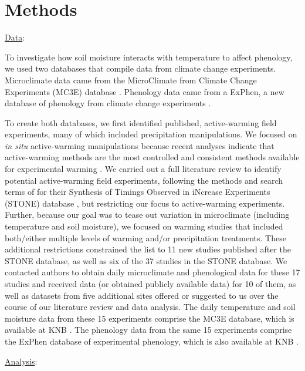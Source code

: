 \documentclass{article}
\begin{document}
\clearpage


\section* {Methods}
\underline{Data}: 
\par To investigate how soil moisture interacts with temperature to affect phenology, we used two databases that compile data from climate change experiments. Microclimate data came from the  MicroClimate from Climate Change Experiments (MC3E) database \cite{ettinger2018}. Phenology data came from a ExPhen, a new database of phenology from climate change experiments \cite{ettinger2018b}. 
\par To create both databases, we first identified published, active-warming field experiments, many of which included precipitation manipulations. We focused on \textit{in situ} active-warming manipulations because recent analyses indicate that active-warming methods are the most controlled and consistent methods available for experimental warming \citep{kimball2005,kimball2008,aronson2009,wolkovich2012}. We carried out a full literature review to identify potential active-warming field experiments, following the methods and search terms of \citet{wolkovich2012} for their Synthesis of Timings Observed in iNcrease Experiments (STONE) database \citep{wolkovich2012}, but restricting our focus to active-warming experiments. Further, because our goal was to tease out variation in microclimate (including temperature and soil moisture), we focused on warming studies that included both/either multiple levels of warming and/or precipitation treatments. These additional restrictions constrained the list to 11 new studies published after the STONE database, as well as six of the 37 studies in the STONE database. We contacted authors to obtain daily microclimate and phenological data for these 17 studies and received data (or obtained publicly available data) for 10 of them, as well as datasets from five additional sites offered or suggested to us over the course of our literature review and data analysis. The daily temperature and soil moisture data from these 15 experiments comprise the MC3E database, which is available at KNB \citep{ettinger2018}. The phenology data from the same 15 experiments comprise the ExPhen database of experimental phenology, which is also available at KNB \citep{ettinger2018b}.

\underline{Analysis}:
\end{document}
